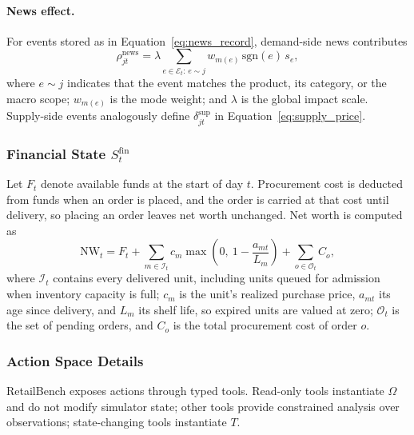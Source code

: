 \paragraph{News effect.}
For events stored as in Equation~\ref{eq:news_record}, demand-side news contributes
\begin{equation}
\rho^{\mathrm{news}}_{jt}
=\lambda\sum_{e\in\mathcal{E}_t:\,e\sim j}
w_{m(e)}\,\mathrm{sgn}(e)\,s_e,
\label{eq:news_effect}
\end{equation}
where $e\sim j$ indicates that the event matches the product, its category, or the macro scope; $w_{m(e)}$ is the mode weight; and $\lambda$ is the global impact scale. Supply-side events analogously define $\delta^{\mathrm{sup}}_{jt}$ in Equation~\ref{eq:supply_price}.

\subsubsection{Financial State \texorpdfstring{$S_t^{\text{fin}}$}{S t fin}}

Let $F_t$ denote available funds at the start of day $t$. Procurement cost is deducted from funds when an order is placed, and the order is carried at that cost until delivery, so placing an order leaves net worth unchanged. Net worth is computed as
\begin{equation}
\mathrm{NW}_t = F_t + \sum_{m\in\mathcal{I}_t} c_m \max\!\left(0,\ 1-\frac{a_{mt}}{L_m}\right) + \sum_{o\in\mathcal{O}_t} C_o,
\end{equation}
where $\mathcal{I}_t$ contains every delivered unit, including units queued for admission when inventory capacity is full; $c_m$ is the unit's realized purchase price, $a_{mt}$ its age since delivery, and $L_m$ its shelf life, so expired units are valued at zero; $\mathcal{O}_t$ is the set of pending orders, and $C_o$ is the total procurement cost of order $o$.

\subsubsection{Action Space Details}
\label{app:action_space_details}

RetailBench exposes actions through typed tools. Read-only tools instantiate $\Omega$ and do not modify simulator state; other tools provide constrained analysis over observations; state-changing tools instantiate $T$.


